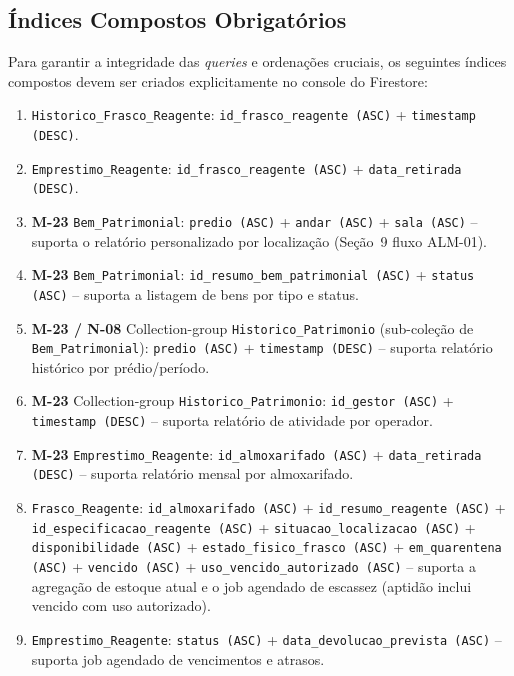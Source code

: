 \subsection{Índices Compostos Obrigatórios}
Para garantir a integridade das \textit{queries} e ordenações cruciais, os seguintes índices compostos devem ser criados explicitamente no console do Firestore:
\begin{enumerate}
    \item \texttt{Historico\_Frasco\_Reagente}: \texttt{id\_frasco\_reagente (ASC)} + \texttt{timestamp (DESC)}.
    \item \texttt{Emprestimo\_Reagente}: \texttt{id\_frasco\_reagente (ASC)} + \texttt{data\_retirada (DESC)}.
    \item \textbf{M-23} \texttt{Bem\_Patrimonial}: \texttt{predio (ASC)} + \texttt{andar (ASC)} + \texttt{sala (ASC)} -- suporta o relatório personalizado por localização (Seção~9 fluxo ALM-01).
    \item \textbf{M-23} \texttt{Bem\_Patrimonial}: \texttt{id\_resumo\_bem\_patrimonial (ASC)} + \texttt{status (ASC)} -- suporta a listagem de bens por tipo e status.
    \item \textbf{M-23 / N-08} Collection-group \texttt{Historico\_Patrimonio} (sub-coleção de \texttt{Bem\_Patrimonial}): \texttt{predio (ASC)} + \texttt{timestamp (DESC)} -- suporta relatório histórico por prédio/período.
    \item \textbf{M-23} Collection-group \texttt{Historico\_Patrimonio}: \texttt{id\_gestor (ASC)} + \texttt{timestamp (DESC)} -- suporta relatório de atividade por operador.
    \item \textbf{M-23} \texttt{Emprestimo\_Reagente}: \texttt{id\_almoxarifado (ASC)} + \texttt{data\_retirada (DESC)} -- suporta relatório mensal por almoxarifado.
    \item \texttt{Frasco\_Reagente}: \texttt{id\_almoxarifado (ASC)} + \texttt{id\_resumo\_reagente (ASC)} +\newline
    \texttt{id\_especificacao\_reagente (ASC)} + \texttt{situacao\_localizacao (ASC)} +\newline
    \texttt{disponibilidade (ASC)} + \texttt{estado\_fisico\_frasco (ASC)} +\newline
    \texttt{em\_quarentena (ASC)} + \texttt{vencido (ASC)} + \texttt{uso\_vencido\_autorizado (ASC)}\newline
    -- suporta a agregação de estoque atual e o job agendado de escassez (aptidão inclui vencido com uso autorizado).
    \item 	\texttt{Emprestimo\_Reagente}: 	\texttt{status (ASC)} + 	\texttt{data\_devolucao\_prevista (ASC)} -- suporta job agendado de vencimentos e atrasos.

\end{enumerate}
